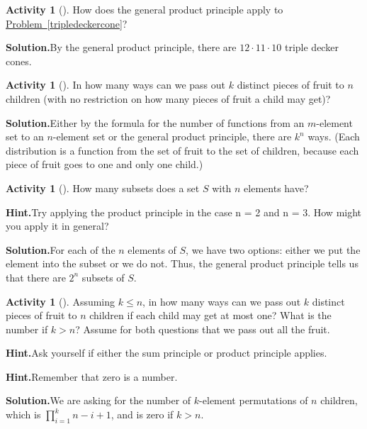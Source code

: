 \documentclass[10pt,]{book}
\theoremstyle{plain}
\theoremstyle{definition}
\newtheorem{activity}[project]{Activity}
\numberwithin{equation}{chapter}
\begin{document}
\begin{activity}[]\label{activity-16}
How does the general product principle apply to \hyperref[tripledeckercone]{Problem~\ref{tripledeckercone}}?%
\par\medskip\noindent%
\textbf{Solution.}\quad By the general product principle, there are \(12\cdot 11\cdot 10\) triple decker cones.%
\end{activity}
\begin{activity}[]\label{activity-17}
In how many ways can we pass out \(k\) distinct pieces of fruit to \(n\) children (with no restriction on how many pieces of fruit a child may get)?%
\par\medskip\noindent%
\textbf{Solution.}\quad Either by the formula for the number of functions from an \(m\)-element set to an \(n\)-element set or the general product principle, there are \(k^n\) ways. (Each distribution is a function from the set of fruit to the set of children, because each piece of fruit goes to one and only one child.)%
\end{activity}
\begin{activity}[]\label{SubsetsFirstTime}
How many subsets does a set \(S\) with \(n\) elements have?%
\par\medskip\noindent%
\textbf{Hint.}\quad Try applying the product principle in the case n = 2 and n = 3. How might you apply it in general?%
\par\medskip\noindent%
\textbf{Solution.}\quad For each of the \(n\) elements of \(S\), we have two options: either we put the element into the subset or we do not. Thus, the general product principle tells us that there are \(2^n\) subsets of \(S\).%
\end{activity}
\begin{activity}[]\label{activity-19}
Assuming \(k\le n\), in how many ways can we pass out \(k\) distinct pieces of fruit to \(n\) children if each child may get at most one? What is the number if \(k>n\)? Assume for both questions that we pass out all the fruit.%
\par\medskip\noindent%
\textbf{Hint.}\quad Ask yourself if either the sum principle or product principle applies.%
\par\medskip\noindent%
\textbf{Hint.}\quad Remember that zero is a number.%
\par\medskip\noindent%
\textbf{Solution.}\quad We are asking for the number of \(k\)-element permutations of \(n\) children, which is \(\prod_{i=1}^k n-i+1\), and is zero if \(k>n\).%
\end{activity}
\end{document}
